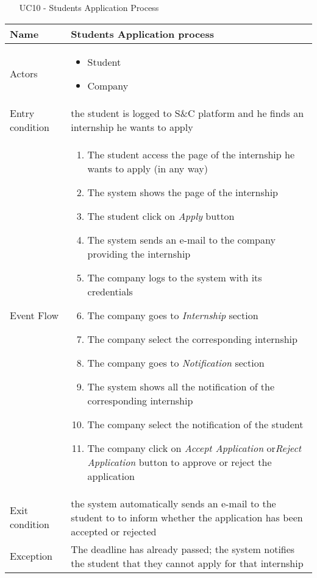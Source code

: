 				
				\begin{table} [H]
					\centering
						\begin{itemize}
						\item [UC10] - Students Application Process
					\end{itemize}
					\begin{tabular}{|| P{7.5cm} | P{7.5cm} ||}
						\hline
						Name & Students Application process \\
						\hline
						Actors & \parbox{5cm}{\begin{itemize}
								\item Student
								\item Company
							\end{itemize}
						} \\
						\hline
						Entry condition & the student is logged to S\&C platform and he finds an internship he wants to apply \\
						\hline
						Event Flow & \parbox{5cm}{\begin{enumerate}
								\item The student access the page of the 
								internship he wants to apply (in any way) 
								\item The system shows the page of the 
								internship 
								\item The student click on \textit{Apply} button
								\item  The system sends an e-mail to the 
								company providing the internship
								\item The company logs to the system with 
								its credentials
								\item The company goes to \textit{ 
								Internship} section
								\item The company select the 
								corresponding internship
								\item The company goes to \textit{Notification} 
								section 
								\item The system shows all the notification 
								of the corresponding internship
								\item The company select the notification 
								of the student 
								\item The company click on \textit{Accept 
								Application} or\textit{Reject Application}
								button to approve or reject the 
								application
						\end{enumerate}} \\
						\hline 
						Exit condition & the system automatically sends an e-mail to 
						the student to to inform whether the 
						application has been accepted or rejected  \\
						\hline
						Exception & The deadline has already passed; the system notifies the student that they cannot apply for that internship \\
						\hline
					\end{tabular}
				\end{table}
				
